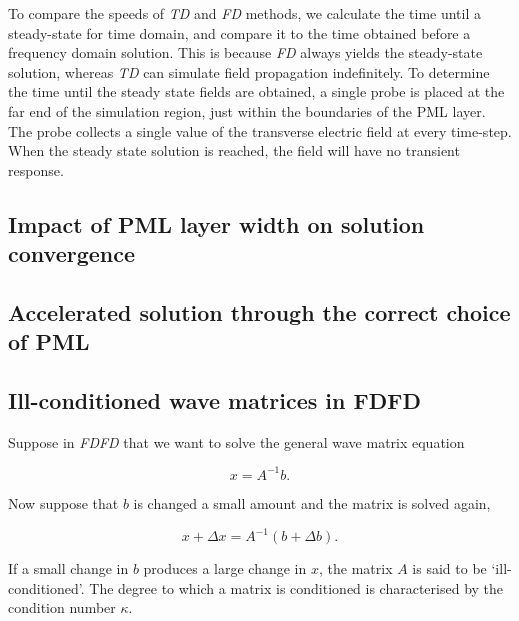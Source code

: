 To compare the speeds of \textit{TD} and \textit{FD} methods, we calculate the time until a steady-state for time domain, and compare it to the time obtained before a frequency domain solution. This is because \textit{FD} always yields the steady-state solution, whereas \textit{TD} can simulate field propagation indefinitely. To determine the time until the steady state fields are obtained, a single probe is placed at the far end of the simulation region, just within the boundaries of the PML layer. The probe collects a single value of the transverse electric field at every time-step. When the steady state solution is reached, the field will have no transient response. 


\subsection{Impact of PML layer width on solution convergence}

\subsection{Accelerated solution through the correct choice of PML}

\subsection{Ill-conditioned wave matrices in FDFD}
Suppose in \textit{FDFD} that we want to solve the general wave matrix equation

\begin{equation}
x = A^{-1}b.
\end{equation}

Now suppose that $b$ is changed a small amount and the matrix is solved again, 

\begin{equation}
x + \Delta x = A^{-1} (b + \Delta b).
\end{equation}

If a small change in $b$ produces a large change in $x$, the matrix $A$ is said to be `ill-conditioned'. The degree to which a matrix is conditioned is characterised by the condition number $\kappa$.